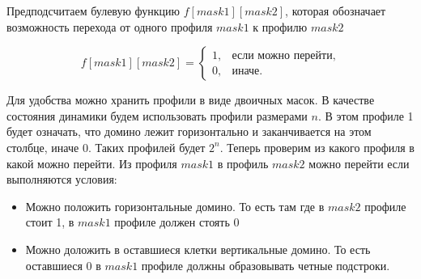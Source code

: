 Предподсчитаем булевую функцию $f[mask1][mask2]$, которая обозначает возможность перехода от одного профиля $mask1$ к профилю $mask2$

$$
    f[mask1][mask2] =
    \begin{cases}
        1,&\text{если можно перейти},\\
        0,&\text{иначе}.
    \end{cases}
$$

Для удобства можно хранить профили в виде двоичных масок.
В качестве состояния динамики будем использовать профили размерами $n$.
В этом профиле 1 будет означать, что домино лежит горизонтально и заканчивается на этом столбце, иначе 0.
Таких профилей будет $2^n$.
Теперь проверим из какого профиля в какой можно перейти.
Из профиля $mask1$ в профиль $mask2$ можно перейти если выполняются условия:
\begin{itemize}
\item Можно положить горизонтальные домино.
    То есть там где в $mask2$ профиле стоит 1, в $mask1$ профиле должен стоять 0
\item Можно доложить в оставшиеся клетки вертикальные домино.
    То есть оставшиеся 0 в $mask1$ профиле должны образовывать четные подстроки.
\end{itemize}

\begin{center}
\end{center}

